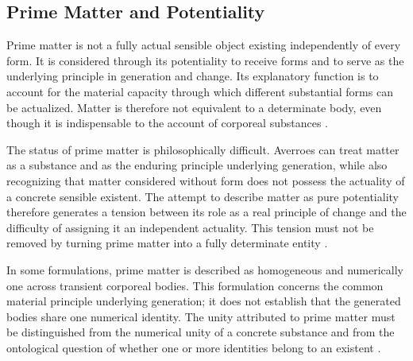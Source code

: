 
\subsection{Prime Matter and Potentiality}
\label{subsec:ch08_s15_ss05}

\label{para:VS.B01.P01.C08.S15.SS05.P001}

Prime matter is not a fully actual sensible object existing
independently of every form. It is considered through its
potentiality to receive forms and to serve as the underlying
principle in generation and change. Its explanatory function
is to account for the material capacity through which
different substantial forms can be actualized. Matter is
therefore not equivalent to a determinate body, even though
it is indispensable to the account of corporeal substances
\citep{AverroesEpitomeMetaphysicsArnzen2010,
AverroesLongCommentaryMetaphysicsBouyges1990}.

\label{para:VS.B01.P01.C08.S15.SS05.P002}

The status of prime matter is philosophically difficult.
Averroes can treat matter as a substance and as the enduring
principle underlying generation, while also recognizing
that matter considered without form does not possess the
actuality of a concrete sensible existent. The attempt to
describe matter as pure potentiality therefore generates
a tension between its role as a real principle of change
and the difficulty of assigning it an independent actuality.
This tension must not be removed by turning prime matter
into a fully determinate entity
\citep{AverroesLongCommentaryMetaphysicsBouyges1990,
BenAhmedPasnauIbnRushdSEP2025}.

\label{para:VS.B01.P01.C08.S15.SS05.P003}

In some formulations, prime matter is described as homogeneous
and numerically one across transient corporeal bodies.
This formulation concerns the common material principle
underlying generation; it does not establish that the
generated bodies share one numerical identity. The unity
attributed to prime matter must be distinguished from the
numerical unity of a concrete substance and from the
ontological question of whether one or more identities
belong to an existent
\citep{AverroesLongCommentaryMetaphysicsBouyges1990,
BenAhmedPasnauIbnRushdSEP2025}.

